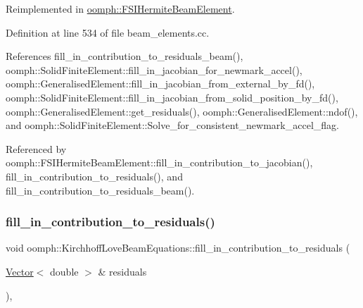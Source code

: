 Reimplemented in \hyperlink{classoomph_1_1FSIHermiteBeamElement_ab81052ae3c54d8387f0d8cd485cf156f}{oomph\+::\+F\+S\+I\+Hermite\+Beam\+Element}.



Definition at line 534 of file beam\+\_\+elements.\+cc.



References fill\+\_\+in\+\_\+contribution\+\_\+to\+\_\+residuals\+\_\+beam(), oomph\+::\+Solid\+Finite\+Element\+::fill\+\_\+in\+\_\+jacobian\+\_\+for\+\_\+newmark\+\_\+accel(), oomph\+::\+Generalised\+Element\+::fill\+\_\+in\+\_\+jacobian\+\_\+from\+\_\+external\+\_\+by\+\_\+fd(), oomph\+::\+Solid\+Finite\+Element\+::fill\+\_\+in\+\_\+jacobian\+\_\+from\+\_\+solid\+\_\+position\+\_\+by\+\_\+fd(), oomph\+::\+Generalised\+Element\+::get\+\_\+residuals(), oomph\+::\+Generalised\+Element\+::ndof(), and oomph\+::\+Solid\+Finite\+Element\+::\+Solve\+\_\+for\+\_\+consistent\+\_\+newmark\+\_\+accel\+\_\+flag.



Referenced by oomph\+::\+F\+S\+I\+Hermite\+Beam\+Element\+::fill\+\_\+in\+\_\+contribution\+\_\+to\+\_\+jacobian(), fill\+\_\+in\+\_\+contribution\+\_\+to\+\_\+residuals(), and fill\+\_\+in\+\_\+contribution\+\_\+to\+\_\+residuals\+\_\+beam().

\mbox{\label{classoomph_1_1KirchhoffLoveBeamEquations_a1b1d654d07a38349b99380cabac33808}} 
\subsubsection{\texorpdfstring{fill\+\_\+in\+\_\+contribution\+\_\+to\+\_\+residuals()}{fill\_in\_contribution\_to\_residuals()}}
{\footnotesize\ttfamily void oomph\+::\+Kirchhoff\+Love\+Beam\+Equations\+::fill\+\_\+in\+\_\+contribution\+\_\+to\+\_\+residuals (\begin{DoxyParamCaption}\item[{\hyperlink{classoomph_1_1Vector}{Vector}$<$ double $>$ \&}]{residuals }\end{DoxyParamCaption})\hspace{0.3cm}{\ttfamily [inline]}, {\ttfamily [virtual]}}



